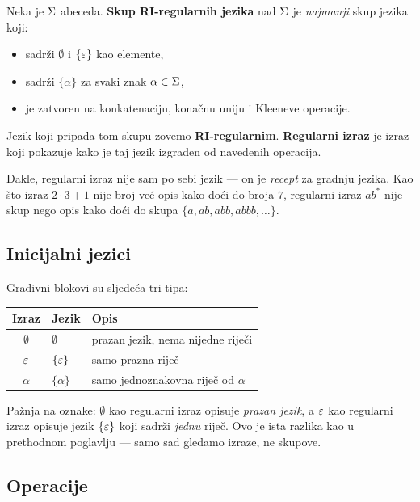 \begin{definicija}
Neka je $\Sigma$ abeceda. \textbf{Skup RI-regularnih jezika} nad $\Sigma$
je \emph{najmanji} skup jezika koji:
\begin{itemize}
  \item sadrži $\emptyset$ i $\{\varepsilon\}$ kao elemente,
  \item sadrži $\{\alpha\}$ za svaki znak $\alpha \in \Sigma$,
  \item je zatvoren na konkatenaciju, konačnu uniju i Kleeneve operacije.
\end{itemize}
Jezik koji pripada tom skupu zovemo \textbf{RI-regularnim}.
\textbf{Regularni izraz} je izraz koji pokazuje kako je taj jezik izgrađen
od navedenih operacija.
\end{definicija}

Dakle, regularni izraz nije sam po sebi jezik --- on je \emph{recept} za
gradnju jezika. Kao što izraz $2 \cdot 3 + 1$ nije broj već opis kako
doći do broja $7$, regularni izraz $ab^*$ nije skup nego opis kako
doći do skupa $\{a, ab, abb, abbb, \ldots\}$.

\subsection{Inicijalni jezici}

Gradivni blokovi su sljedeća tri tipa:

\begin{center}
\renewcommand{\arraystretch}{1.5}
\begin{tabular}{cll}
\hline
\textbf{Izraz} & \textbf{Jezik} & \textbf{Opis} \\
\hline
$\emptyset$ & $\emptyset$ & prazan jezik, nema nijedne riječi \\
$\varepsilon$      & $\{\varepsilon\}$  & samo prazna riječ \\
$\alpha$    & $\{\alpha\}$ & samo jednoznakovna riječ od $\alpha$ \\
\hline
\end{tabular}
\end{center}

\begin{napomena}
Pažnja na oznake: $\emptyset$ kao regularni izraz opisuje \emph{prazan jezik},
a $\varepsilon$ kao regularni izraz opisuje jezik $\{\varepsilon\}$ koji sadrži \emph{jednu}
riječ. Ovo je ista razlika kao u prethodnom poglavlju --- samo sad gledamo
izraze, ne skupove.
\end{napomena}

\subsection{Operacije}

